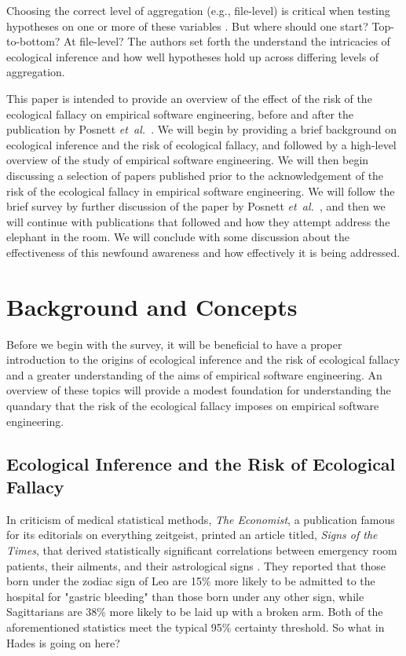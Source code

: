 \documentclass{sig-alternate-05-2015}
\newcommand{\etal}{\mbox{\emph{et al.\ }}}
\begin{document}
Choosing the correct level of aggregation (e.g., file-level) is critical when testing hypotheses on one or more of these variables \cite{Posnett:2011}.  But where should one start? Top-to-bottom? At file-level?  The authors set forth the understand the intricacies of ecological inference and how well hypotheses hold up across differing levels of aggregation.

This paper is intended to provide an overview of the effect of the risk of the ecological fallacy on empirical software engineering, before and after the publication by Posnett \etal.   We will begin by providing a brief background on ecological inference and the risk of ecological fallacy, and followed by a high-level overview of the study of empirical software engineering.  We will then begin discussing a selection of papers published prior to the acknowledgement of the risk of the ecological fallacy in empirical software engineering. We will follow the brief survey by further discussion of the paper by Posnett \etal, and then we will continue with publications that followed and how they attempt address the elephant in the room.  We will conclude with some discussion about the effectiveness of this newfound awareness and how effectively it is being addressed.

\section{Background and Concepts}

Before we begin with the survey, it will be beneficial to have a proper introduction to the origins of ecological inference and the risk of ecological fallacy and a greater understanding of the aims of empirical software engineering.  An overview of these topics will provide a modest foundation for understanding the quandary that the risk of the ecological fallacy imposes on empirical software engineering.

\subsection{Ecological Inference and the Risk of Ecological Fallacy}
In criticism of medical statistical methods, \emph{The Economist}, a publication famous for its editorials on everything zeitgeist, printed an article titled, \emph{Signs of the Times}, that derived statistically significant correlations between emergency room patients, their ailments, and their astrological signs \cite{Economist:2007}.  They reported that those born under the zodiac sign of Leo are 15\% more likely to be admitted to the hospital for "gastric bleeding" than those born under any other sign, while Sagittarians are 38\% more likely to be laid up with a broken arm.  Both of the aforementioned statistics meet the typical 95\% certainty threshold.  So what in Hades is going on here?
\end{document}
